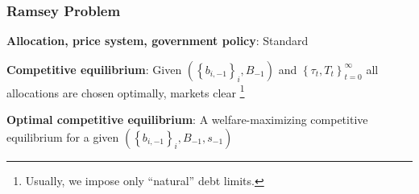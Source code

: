 \documentclass{beamer}
\begin{document}
\begin{frame}
 \frametitle{Ramsey Problem}

\begin{definition}
\textbf{Allocation, price system, government policy}: Standard

\end{definition}

\begin{definition}
\textbf{Competitive equilibrium}: Given $\left( \left\{ b_{i,-1}\right\}
_{i},B_{-1}\right) $ and $\left\{ \tau _{t},T_{t}\right\} _{t=0}^{\infty }$
all allocations are chosen optimally, markets clear \footnote{Usually, we impose only  ``natural'' debt limits. }
\end{definition}

\begin{definition}
\textbf{Optimal competitive equilibrium}: A welfare-maximizing competitive
equilibrium for a given $\left( \left\{ b_{i,-1}\right\} _{i},B_{-1},s_{-1}\right) $
\end{definition}

 \end{frame}

% 
%
\end{document}

